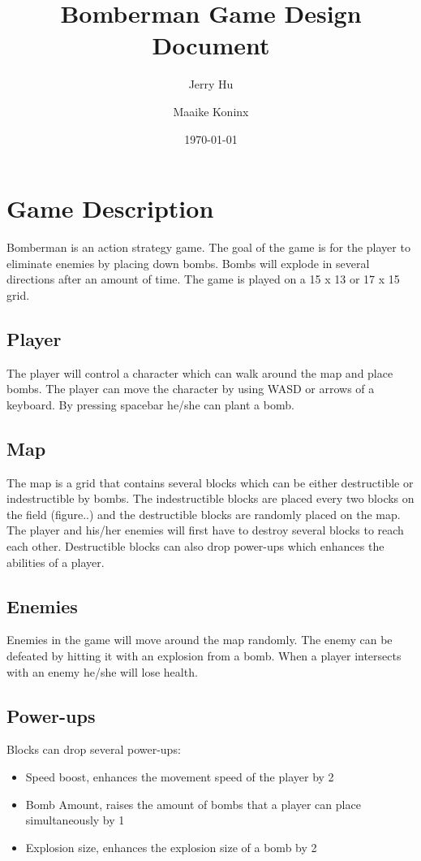 \documentclass[a4paper, 12]{article}
\begin{document}
		
		\title{Bomberman Game Design Document}
		\author[1]{Jerry Hu}
		\author[2] {Maaike Koninx}
		\date{\today}	
		\maketitle
		
		\section{Game Description}
			Bomberman is an action strategy game. The goal of the game is for the player to eliminate enemies by placing down bombs. Bombs will explode in several directions after an amount of time. The game is played on a 15 x 13 or 17 x 15 grid. 
		
		\subsection{Player}
		The player will control a character which can walk around the map and place bombs. The player can move the character by using WASD or arrows of a keyboard. By pressing spacebar he/she can plant a bomb. 
		\subsection{Map}			
			The map is a grid that contains several blocks which can be either destructible or indestructible by bombs. The indestructible blocks are placed every two blocks on the field (figure..) and the destructible blocks are randomly placed on the map. The player and his/her enemies will first have to destroy several blocks to reach each other. Destructible blocks can also drop power-ups which enhances the abilities of a player. 
		
		\subsection{Enemies}
		
		Enemies in the game will move around the map randomly. The enemy can be defeated by hitting it with an explosion from a bomb. When a player intersects with an enemy he/she will lose health. 
		
		\subsection{Power-ups}
		Blocks can drop several power-ups:
		\begin{itemize}
			\item Speed boost, enhances the movement speed of the player by 2
			\item Bomb Amount, raises the amount of bombs that a player can place simultaneously by 1
			\item Explosion size, enhances the explosion size of a bomb by 2
		\end{itemize}
\end{document}
